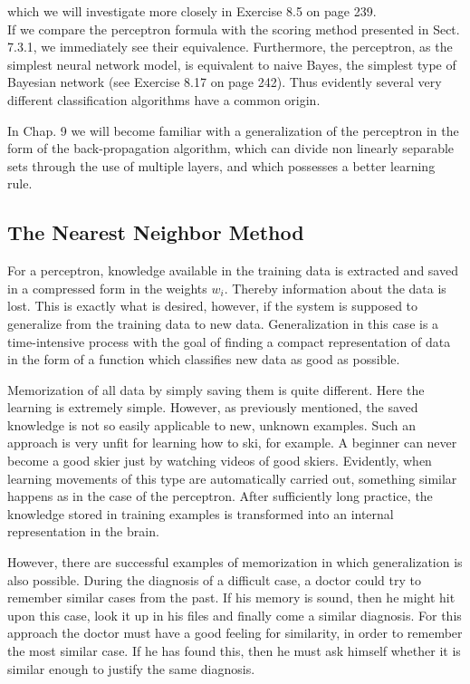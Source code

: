 \documentclass[10pt]{book}
\begin{document}
which we will investigate more closely in Exercise 8.5 on page 239.\\
If we compare the perceptron formula with the scoring method presented in Sect. 7.3.1, we immediately see their equivalence. Furthermore, the perceptron, as the simplest neural network model, is equivalent to naive Bayes, the simplest type of Bayesian network (see Exercise 8.17 on page 242). Thus evidently several very different classification algorithms have a common origin.

In Chap. 9 we will become familiar with a generalization of the perceptron in the form of the back-propagation algorithm, which can divide non linearly separable sets through the use of multiple layers, and which possesses a better learning rule.

\subsection*{The Nearest Neighbor Method}
For a perceptron, knowledge available in the training data is extracted and saved in a compressed form in the weights $w_{i}$. Thereby information about the data is lost. This is exactly what is desired, however, if the system is supposed to generalize from the training data to new data. Generalization in this case is a time-intensive process with the goal of finding a compact representation of data in the form of a function which classifies new data as good as possible.

Memorization of all data by simply saving them is quite different. Here the learning is extremely simple. However, as previously mentioned, the saved knowledge is not so easily applicable to new, unknown examples. Such an approach is very unfit for learning how to ski, for example. A beginner can never become a good skier just by watching videos of good skiers. Evidently, when learning movements of this type are automatically carried out, something similar happens as in the case of the perceptron. After sufficiently long practice, the knowledge stored in training examples is transformed into an internal representation in the brain.

However, there are successful examples of memorization in which generalization is also possible. During the diagnosis of a difficult case, a doctor could try to remember similar cases from the past. If his memory is sound, then he might hit upon this case, look it up in his files and finally come a similar diagnosis. For this approach the doctor must have a good feeling for similarity, in order to remember the most similar case. If he has found this, then he must ask himself whether it is similar enough to justify the same diagnosis.
\end{document}
